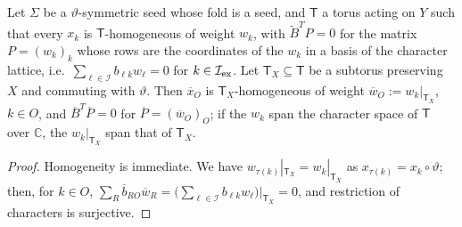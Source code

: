 \documentclass[a4paper]{amsart}
\numberwithin{equation}{section}
\theoremstyle{definition}
\theoremstyle{remark}
\newcommand{\bbC}{\mathbb{C}}
\newcommand{\mcI}{\mathcal{I}}
\newcommand{\tB}{\widetilde{B}}
\newcommand{\vt}{\vartheta}
\newcommand{\ex}{{\rm ex}}
\begin{document}
\begin{proposition}
  \label{prop: fold toric}
  Let $\Sigma$ be a $\vt$-symmetric seed whose fold is a seed, and $\mathsf T$ a torus acting on $Y$ such that every $x_k$ is $\mathsf T$-homogeneous of weight $w_k$, with $\tB^TP=0$ for the matrix $P=(w_k)_k$ whose rows are the coordinates of the $w_k$ in a basis of the character lattice, i.e.\ $\sum_{\ell\in\mcI}b_{\ell k}w_\ell=0$ for $k\in\mcI_\ex$.
  Let $\mathsf T_X\subseteq\mathsf T$ be a subtorus preserving $X$ and commuting with $\vt$.
  Then $\overline{x}_O$ is $\mathsf T_X$-homogeneous of weight $\overline{w}_O:=w_k|_{\mathsf T_X}$, $k\in O$, and $\overline{B}^T\overline{P}=0$ for $\overline{P}=(\overline{w}_O)_O$; if the $w_k$ span the character space of $\mathsf T$ over $\bbC$, the $w_k|_{\mathsf T_X}$ span that of $\mathsf T_X$.
\end{proposition}
\begin{proof}
  Homogeneity is immediate. We have $w_{\tau(k)}|_{\mathsf T_X}=w_k|_{\mathsf T_X}$ as $x_{\tau(k)}=x_k\circ\vt$; then, for $k\in O$, $\sum_R\overline{b}_{RO}\overline{w}_R=\big(\sum_{\ell\in\mcI}b_{\ell k}w_\ell\big)|_{\mathsf T_X}=0$, and restriction of characters is surjective.
\end{proof}
\end{document}
